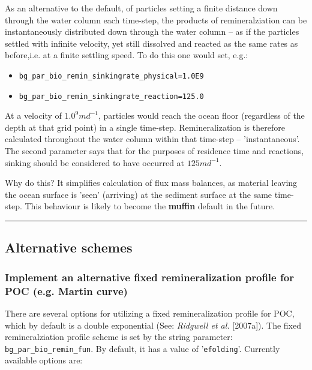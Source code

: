 \documentclass[11pt,fleqn]{book} %
\begin{document}
As an alternative to the default, of particles setting a finite distance down through the water column each time-step, the products of remineralziation can be instantaneously distributed down through the water column -- as if the particles settled with infinite velocity, yet still dissolved and reacted as the same rates as before,i.e. at a finite settling speed. To do this one would set, e.g.:
\vspace{1mm}
\begin{itemize}[noitemsep]
\item[] \texttt{bg\_par\_bio\_remin\_sinkingrate\_physical=1.0E9}
\item[] \texttt{bg\_par\_bio\_remin\_sinkingrate\_reaction=125.0}
\end{itemize}
\vspace{1mm}
At a velocity of \(1.0^{9}md^{-1}\), particles would reach the ocean floor (regardless of the depth at that grid point) in a single time-step. Remineralization is therefore calculated throughout the water column within that time-step -- 'instantaneous'. The second parameter says that for the purposes of residence time and reactions, sinking should be considered to have occurred at \(125md^{-1}\).

Why do this? It simplifies calculation of flux mass balances, as material leaving the ocean surface is 'seen' (arriving) at the sediment surface at the same time-step. This behaviour is likely to become the \textbf{muffin} default in the future.

%
\noindent\rule{4cm}{0.5pt}
\subsection*{Alternative schemes}
\vspace{1mm}

%
\subsubsection{Implement an alternative fixed remineralization profile for POC (e.g. Martin curve)}
\vspace{1mm}

There are several options for utilizing a fixed remineralization profile for POC, which by default is a double exponential (See: \textit{Ridgwell et al.} [2007a]).
The fixed remineralziation profile scheme is set by the string parameter: \texttt{bg\_par\_bio\_remin\_fun}. By default, it has a value of '\texttt{efolding}'. Currently available options are:
\end{document}
